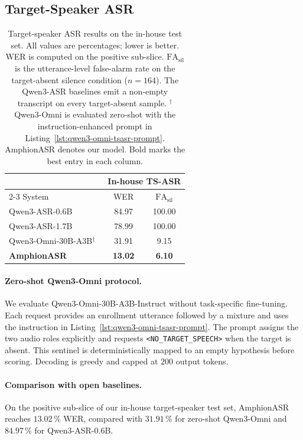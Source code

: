 \subsection{Target-Speaker ASR}
\label{sec:tsasr}

\begin{table}[t]
  \caption{Target-speaker ASR results on the in-house test set. All
    values are percentages; lower is better. WER is computed on the
    positive sub-slice. $\text{FA}_\text{sil}$ is the utterance-level
    false-alarm rate on the target-absent silence condition ($n=164$).
    The Qwen3-ASR baselines emit a non-empty transcript on every
    target-absent sample. $^\dagger$Qwen3-Omni is evaluated zero-shot
    with the instruction-enhanced prompt in
    Listing~\ref{lst:qwen3-omni-tsasr-prompt}.
    AmphionASR denotes our model.
    Bold marks the best entry in each column.}
  \label{tab:tsasr}
  \centering
  \small
  \setlength{\tabcolsep}{5pt}
  \begin{tabular}{lcc}
    \toprule
    & \multicolumn{2}{c}{In-house TS-ASR} \\
    \cmidrule(lr){2-3}
    System & WER & $\text{FA}_\text{sil}$ \\
    \midrule
    Qwen3-ASR-0.6B~\cite{qwen2025qwen3asr} & 84.97 & 100.00 \\
    Qwen3-ASR-1.7B~\cite{qwen2025qwen3asr} & 78.99 & 100.00 \\
    Qwen3-Omni-30B-A3B$^\dagger$~\cite{qwen2025qwen3omni} & 31.91 & 9.15 \\
    \midrule
    \textbf{AmphionASR}                    & \textbf{13.02} & \textbf{6.10} \\
    \bottomrule
  \end{tabular}
\end{table}

\paragraph{Zero-shot Qwen3-Omni protocol.}
We evaluate Qwen3-Omni-30B-A3B-Instruct without task-specific
fine-tuning. Each request provides an enrollment utterance followed by
a mixture and uses the instruction in
Listing~\ref{lst:qwen3-omni-tsasr-prompt}. The prompt assigns the two
audio roles explicitly and requests
\mbox{\texttt{<NO\_TARGET\_SPEECH>}} when
the target is absent. This sentinel is deterministically mapped to an
empty hypothesis before scoring. Decoding is greedy and capped at
$200$ output tokens.

\paragraph{Comparison with open baselines.}
On the positive sub-slice of our in-house target-speaker test set,
AmphionASR reaches $13.02$\,\% WER, compared with $31.91$\,\% for
zero-shot Qwen3-Omni and $84.97$\,\% for Qwen3-ASR-0.6B.

